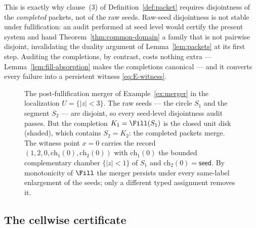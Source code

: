 \begin{example}
This is exactly why clause~(3) of Definition~\ref{def:packet} requires disjointness
of the \emph{completed} packets, not of the raw seeds. Raw-seed disjointness is not
stable under fullification: an audit performed at seed level would certify the
present system and hand Theorem~\ref{thm:common-domain} a family that is not
pairwise disjoint, invalidating the duality argument of Lemma~\ref{lem:packets} at
its first step. Auditing the completions, by contrast, costs nothing extra ---
Lemma~\ref{lem:fill-absorption} makes the completions canonical --- and it converts
every failure into a persistent witness \eqref{eq:E-witness}.
\end{example}

\begin{figure}[t]
\centering
{}
\caption{The post-fullification merger of Example~\ref{ex:merger} in the
localization $U=\{|z|<3\}$. The raw seeds --- the circle $S_1$ and the segment
$S_2$ --- are disjoint, so every seed-level disjointness audit passes. But the
completion $K_1=\Fill(S_1)$ is the closed unit disk (shaded), which contains
$S_2=K_2$: the completed packets merge. The witness point $x=0$ carries the record
$(1,2,0,\mathrm{ch}_1(0),\mathrm{ch}_2(0))$ with $\mathrm{ch}_1(0)$ the bounded
complementary chamber $\{|z|<1\}$ of $S_1$ and $\mathrm{ch}_2(0)=\textsf{seed}$. By
monotonicity of $\Fill$ the merger persists under every same-label enlargement of
the seeds; only a different typed assignment removes it.}
\label{fig:merger}
\end{figure}

\subsection{The cellwise certificate}\label{subsec:E-cellwise}

